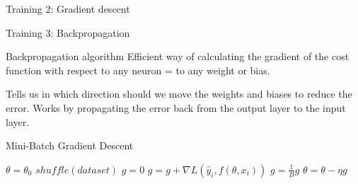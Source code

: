 \documentclass{beamer}
\begin{document}
\begin{frame}{Training 2: Gradient descent}


\end{frame}


\begin{frame}{Training 3: Backpropagation}

\begin{block}{Backpropagation algorithm}
Efficient way of calculating the gradient of the cost function with respect to any neuron = to any weight or bias.
\end{block}
\vfill
Tells us in which direction should we move the weights and biases to reduce the error.
\vfill
Works by propagating the error back from the output layer to the input layer.
\end{frame}

\begin{frame}{Mini-Batch Gradient Descent}

\begin{algorithm}[H]
  \label{alg:mini_SGD}
  \caption{Mini-batch Stochastic Gradient Descent}
  \DontPrintSemicolon
  $\theta = \theta_0$\;
  {
  $\mathit{shuffle(dataset)}$\;
  {
  $g = 0$\;
    {
     $g = g + \nabla L(\hat{y}_i,f(\theta, x_i))$\;
    }
  $g = \frac{1}{B} g$\;
  $\theta = \theta - \eta g$
  }
  }
\end{algorithm}

\end{frame}
\end{document}
